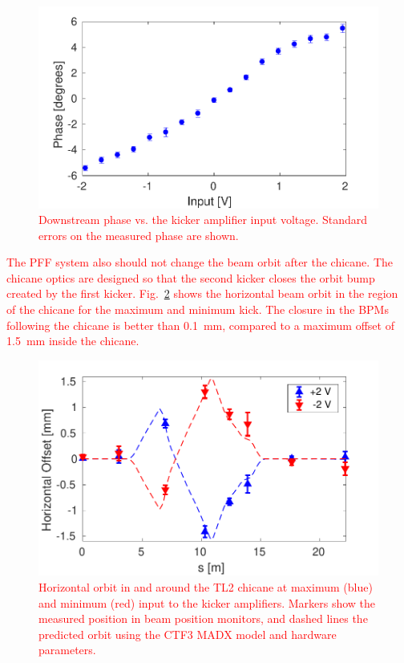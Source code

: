 \documentclass[%
 reprint,
superscriptaddress,
 amsmath,amssymb,
 prl,
]{revtex4-1}
\begin{document}
\begin{figure}
	\includegraphics[width=\columnwidth]{figs/corrRange}
	\caption{\label{fig:corrRange}\textcolor{red}{Downstream phase vs. the 
	kicker amplifier 
	input voltage. Standard errors on the measured phase are shown.}}
\end{figure}

\textcolor{red}{The PFF system also should not change the beam orbit after the 
chicane. The 
chicane optics are designed so that the second kicker closes the orbit bump 
created by the first kicker.
Fig.~\ref{fig:orbClos} shows the horizontal beam orbit in the region 
of the chicane for the maximum and minimum kick. The closure in 
the BPMs following the chicane is better than 0.1~mm, compared to a maximum 
offset of 1.5~mm inside the chicane.}

\begin{figure}
	\includegraphics[width=\columnwidth]{figs/orbClos}
	\caption{\label{fig:orbClos}\textcolor{red}{Horizontal orbit in and around 
	the TL2 chicane at maximum (blue) and minimum (red) 
	input to the kicker amplifiers. Markers show the measured position in beam 
	position monitors, and dashed lines the predicted orbit using the 
	CTF3 MADX model and hardware parameters.}}
\end{figure}
\end{document}
